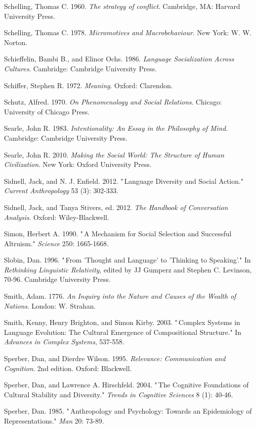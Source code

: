 Schelling, Thomas C. 1960. \textit{The strategy of conflict}. 
Cambridge, MA: Harvard University Press.

Schelling, Thomas C. 1978. \textit{Micromotives and Macrobehaviour}. 
New York: W. W. Norton.

Schieffelin, Bambi B., and Elinor Ochs. 1986. \textit{Language 
Socialization Across Cultures}. Cambridge: Cambridge University Press.

Schiffer, Stephen R. 1972. \textit{Meaning}. Oxford: Clarendon.

Schutz, Alfred. 1970. \textit{On Phenomenology and Social Relations}. 
Chicago: University of Chicago Press.

Searle, John R. 1983. \textit{Intentionality: An Essay in the 
Philosophy of Mind}. Cambridge: Cambridge University Press.

Searle, John R. 2010. \textit{Making the Social World: The Structure of 
Human Civilization}. New York: Oxford University Press.

Sidnell, Jack, and N. J. Enfield. 2012. "\,Language Diversity and Social 
Action." \textit{Current Anthropology} 53 (3): 302-333.

Sidnell, Jack, and Tanya Stivers, ed. 2012. \textit{The Handbook of 
Conversation Analysis}. Oxford: Wiley-Blackwell.

Simon, Herbert A. 1990. "\,A Mechanism for Social Selection and 
Successful Altruism." \textit{Science} 250: 1665-1668.

Slobin, Dan. 1996. "\,From 'Thought and Language' to 'Thinking to 
Speaking'." In \textit{Rethinking Linguistic Relativity}, edited by 
JJ Gumperz and Stephen C. Levinson, 70-96. Cambridge University Press.

Smith, Adam. 1776. \textit{An Inquiry into the Nature and Causes of the 
Wealth of Nations}. London: W. Strahan.

Smith, Kenny, Henry Brighton, and Simon Kirby. 2003. "\,Complex Systems 
in Language Evolution: The Cultural Emergence of Compositional 
Structure." In \textit{Advances in Complex Systems}, 537-558.

Sperber, Dan, and Dierdre Wilson. 1995. \textit{Relevance: 
Communication and Cognition}. 2nd edition. Oxford: Blackwell.

Sperber, Dan, and Lawrence A. Hirschfeld. 2004. "\,The Cognitive 
Foundations of Cultural Stability and Diversity." \textit{Trends in 
Cognitive Sciences} 8 (1): 40-46.

Sperber, Dan. 1985. "\,Anthropology and Psychology: Towards an 
Epidemiology of Representations." \textit{Man} 20: 73-89.

